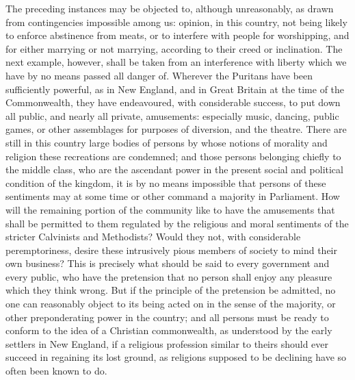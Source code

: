 \documentclass[11pt,openany]{book}
\begin{document}
The preceding instances may be objected to, although unreasonably, as drawn from contingencies impossible among us: opinion, in this country, not being likely to enforce abstinence from meats, or to interfere with people for worshipping, and for either marrying or not marrying, according to their creed or inclination. The next example, however, shall be taken from an interference with liberty which we have by no means passed all danger of. Wherever the Puritans have been sufficiently powerful, as in New England, and in Great Britain at the time of the Commonwealth, they have endeavoured, with considerable success, to put down all public, and nearly all private, amusements: especially music, dancing, public games, or other assemblages for purposes of diversion, and the theatre. There are still in this country large bodies of persons by whose notions of morality and religion these recreations are condemned; and those persons belonging chiefly to the middle class, who are the ascendant power in the present social and political condition of the kingdom, it is by no means impossible that persons of these sentiments may at some time or other command a majority in Parliament. How will the remaining portion of the community like to have the amusements that shall be permitted to them regulated by the religious and moral sentiments of the stricter Calvinists and Methodists? Would they not, with considerable peremptoriness, desire these intrusively pious members of society to mind their own business? This is precisely what should be said to every government and every public, who have the pretension that no person shall enjoy any pleasure which they think wrong. But if the principle of the pretension be admitted, no one can reasonably object to its being acted on in the sense of the majority, or other preponderating power in the country; and all persons must be ready to conform to the idea of a Christian commonwealth, as understood by the early settlers in New England, if a religious profession similar to theirs should ever succeed in regaining its lost ground, as religions supposed to be declining have so often been known to do.
\end{document}
